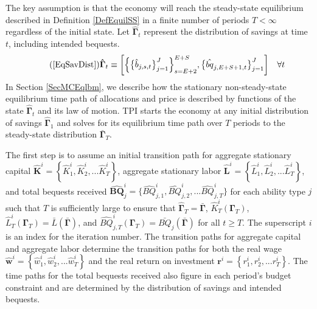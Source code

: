 \documentclass[letterpaper,12pt]{article}
\theoremstyle{definition}
\begin{document}
  The key assumption is that the economy will reach the steady-state equilibrium described in Definition \ref{DefEquilSS} in a finite number of periods $T<\infty$ regardless of the initial state. Let $\bm{\hat{\Gamma}}_t$ represent the distribution of savings at time $t$, including intended bequests.
  \begin{equation}\tag{\ref{EqSavDist}}
    \bm{\hat{\Gamma}}_t \equiv \biggl[\Bigl\{\bigl\{\hat{b}_{j,s,t}\bigr\}_{j=1}^J\Bigr\}_{s=E+2}^{E+S},\bigl\{\hat{bq}_{j,E+S+1,t}\bigr\}_{j=1}^J\biggr] \quad\forall t
  \end{equation}
  In Section \ref{SecMCEqlbm}, we describe how the stationary non-steady-state equilibrium time path of allocations and price is described by functions of the state $\bm{\hat{\Gamma}}_t$ and its law of motion. TPI starts the economy at any initial distribution of savings $\bm{\hat{\Gamma}}_1$ and solves for its equilibrium time path over $T$ periods to the steady-state distribution $\bm{\bar{\Gamma}}_T$.

  The first step is to assume an initial transition path for aggregate stationary capital $\bm{\hat{K}}^i = \left\{\hat{K}_1^i,\hat{K}_2^i,...\hat{K}_T^i\right\}$, aggregate stationary labor $\bm{\hat{L}}^i = \left\{\hat{L}_1^i,\hat{L}_2^i,...\hat{L}_T^i\right\}$, and total bequests received $\bm{\hat{BQ}}_j^i=\{\hat{BQ}_{j,1}^i,\hat{BQ}_{j,2}^i,...\hat{BQ}_{j,T}^i\}$ for each ability type $j$ such that $T$ is sufficiently large to ensure that $\bm{\hat{\Gamma}}_T = \bar{\bm{\Gamma}}$, $\hat{K}_T^i\left(\bm{\Gamma}_T\right)$, $\hat{L}_T^i\left(\bm{\Gamma}_T\right) = \bar{L}\left(\bar{\bm{\Gamma}}\right)$, and $\hat{BQ}_{j,T}^i\left(\bm{\Gamma}_T\right) = \bar{BQ}_j\left(\bar{\bm{\Gamma}}\right)$ for all $t\geq T$. The superscript $i$ is an index for the iteration number. The transition paths for aggregate capital and aggregate labor determine the transition paths for both the real wage $\bm{\hat{w}}^i = \left\{\hat{w}_1^i,\hat{w}_2^i,...\hat{w}_T^i\right\}$ and the real return on investment $\bm{r}^i = \left\{r_1^i,r_2^i,...r_T^i\right\}$. The time paths for the total bequests received also figure in each period's budget constraint and are determined by the distribution of savings and intended bequests.
\end{document}
